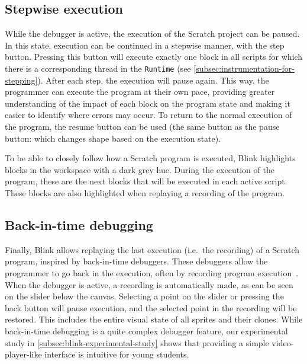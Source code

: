\documentclass[../main]{subfiles}
\begin{document}
\subsection{Stepwise execution}\label{subsec:stepwise-execution}
While the debugger is active, the execution of the Scratch project can be paused.
In this state, execution can be continued in a stepwise manner, with the step button.
Pressing this button will execute exactly one block in all scripts for which there is a corresponding thread in the \texttt{Runtime} (see \cref{subsec:instrumentation-for-stepping}).
After each step, the execution will pause again.
This way, the programmer can execute the program at their own pace, providing greater understanding of the impact of each block on the program state and making it easier to identify where errors may occur.
To return to the normal execution of the program, the resume button can be used (the same button as the pause button: which changes shape based on the execution state).

To be able to closely follow how a Scratch program is executed, Blink highlights blocks in the workspace with a dark grey hue.
During the execution of the program, these are the next blocks that will be executed in each active script.
These blocks are also highlighted when replaying a recording of the program.

\subsection{Back-in-time debugging}\label{subsec:back-in-time-debugging}
Finally, Blink allows replaying the last execution (i.e.\ the recording) of a Scratch program, inspired by back-in-time debuggers.
These debuggers allow the programmer to go back in the execution, often by recording program execution~\autocite{barrTardisAffordableTimetravel2014,barrTimetravelDebuggingJavaScript2016,czaplickiAsynchronousFunctionalReactive2013,balzerEXDAMSExtendableDebugging1969,ungarDebuggingExperienceImmediacy1997,chenReversibleDebuggingUsing2001,crescenziReversibleExecutionVisualization2000}.
When the debugger is active, a recording is automatically made, as can be seen on the slider below the canvas.
Selecting a point on the slider or pressing the back button will pause execution, and the selected point in the recording will be restored.
This includes the entire visual state of all sprites and their clones.
While back-in-time debugging is a quite complex debugger feature, our experimental study in \cref{subsec:blink-experimental-study} shows that providing a simple video-player-like interface is intuitive for young students.
\end{document}
